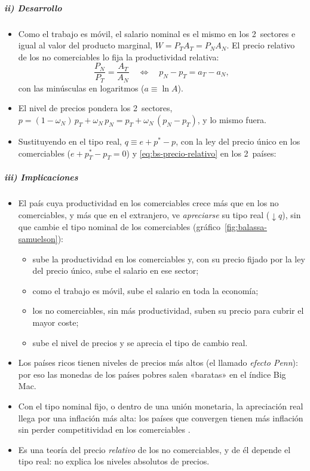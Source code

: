 \documentclass[11pt]{article}
\begin{document}
\subparagraph{ii) Desarrollo}
\begin{itemize}
\item Como el trabajo es móvil, el salario nominal es el mismo en los 2~sectores e igual al valor del producto marginal, $W=P_TA_T=P_NA_N$. El precio relativo de los no comerciables lo fija la productividad relativa:
  \begin{equation}\label{eq:bs-precio-relativo}
  \frac{P_N}{P_T}=\frac{A_T}{A_N}\quad\Longleftrightarrow\quad p_N-p_T=a_T-a_N ,
  \end{equation}
  con las minúsculas en logaritmos ($a\equiv\ln A$).
\item El nivel de precios pondera los 2~sectores, $p=(1-\omega_N)\,p_T+\omega_N\,p_N=p_T+\omega_N\,(p_N-p_T)$, y lo mismo fuera.
\item Sustituyendo en el tipo real, $q\equiv e+p^*-p$, con la ley del precio único en los comerciables ($e+p^*_T-p_T=0$) y \eqref{eq:bs-precio-relativo} en los 2~países:
\end{itemize}

\subparagraph{iii) Implicaciones}
\begin{itemize}
\item El país cuya productividad en los comerciables crece más que en los no comerciables, y más que en el extranjero, ve \emph{apreciarse} su tipo real ($\downarrow q$), sin que cambie el tipo nominal de los comerciables (gráfico~\ref{fig:balassa-samuelson}):
  \begin{itemize}
  \item sube la productividad en los comerciables y, con su precio fijado por la ley del precio único, sube el salario en ese sector;
  \item como el trabajo es móvil, sube el salario en toda la economía;
  \item los no comerciables, sin más productividad, suben su precio para cubrir el mayor coste;
  \item sube el nivel de precios y se aprecia el tipo de cambio real.
  \end{itemize}
\item Los países ricos tienen niveles de precios más altos (el llamado \emph{efecto Penn}): por eso las monedas de los países pobres salen «baratas» en el índice Big Mac.
\item Con el tipo nominal fijo, o dentro de una unión monetaria, la apreciación real llega por una inflación más alta: los países que convergen tienen más inflación sin perder competitividad en los comerciables  .
\item Es una teoría del precio \emph{relativo} de los no comerciables, y de él depende el tipo real: no explica los niveles absolutos de precios.
\end{itemize}
\end{document}
